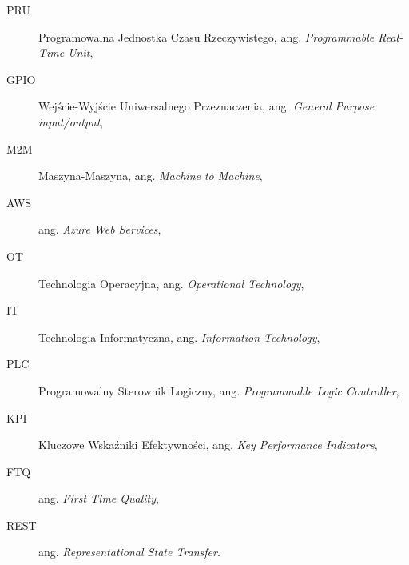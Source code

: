 \documentclass[a4paper, 12pt, twoside]{article}
\begin{document}
\begin{description}
      \item[PRU] Programowalna Jednostka Czasu Rzeczywistego, ang. \emph{Programmable Real-Time Unit},
      \item[GPIO] Wejście-Wyjście Uniwersalnego Przeznaczenia, ang. \emph{General Purpose input/output},
      \item[M2M] Maszyna-Maszyna, ang. \emph{Machine to Machine},
      \item[AWS] ang. \emph{Azure Web Services},
      \item[OT] Technologia Operacyjna, ang. \emph{Operational Technology},
      \item[IT] Technologia Informatyczna, ang. \emph{Information Technology},
      \item[PLC] Programowalny Sterownik Logiczny, ang. \emph{Programmable Logic Controller},
      \item[KPI] Kluczowe Wskaźniki Efektywności, ang. \emph{Key Performance Indicators},
      \item[FTQ] ang. \emph{First Time Quality},
      \item[REST] ang. \emph{Representational State Transfer}.
\end{description}
\end{document}
